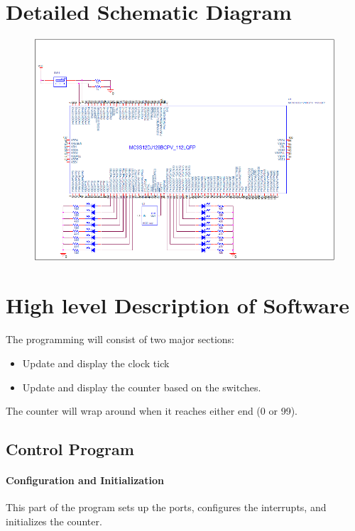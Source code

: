 \documentclass{article}
\begin{document}
	\section*{Detailed Schematic Diagram}
		\begin{figure}[H]
		\centering
		\includegraphics[width=1\textwidth]{Lab3}
	\end{figure}
	\section*{High level Description of Software}
	The programming will consist of two major sections:
	\begin{itemize}
		\item Update and display the clock tick
		\item Update and display the counter based on the switches.
	\end{itemize}
	The counter will wrap around when it reaches either end (0 or 99).
	\subsection*{Control Program}
	\paragraph{Configuration and Initialization}
	This part of the program sets up the ports, configures the interrupts, and initializes the counter.
\end{document}
